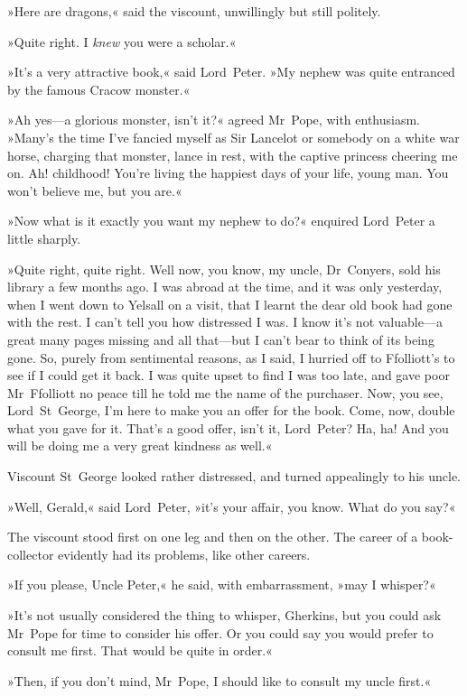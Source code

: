 »Here are dragons,« said the viscount, unwillingly but still politely.

»Quite right. I \textit{knew} you were a scholar.«

»It's a very attractive book,« said Lord~Peter. »My nephew was quite entranced by the famous Cracow monster.«

»Ah yes—a glorious monster, isn't it?« agreed Mr~Pope, with enthusiasm. »Many's the time I've fancied myself as Sir Lancelot or somebody on a white war horse, charging that monster, lance in rest, with the captive princess cheering me on. Ah! childhood! You're living the happiest days of your life, young man. You won't believe me, but you are.«

»Now what is it exactly you want my nephew to do?« enquired Lord~Peter a little sharply.

»Quite right, quite right. Well now, you know, my uncle, Dr~Conyers, sold his library a few months ago. I was abroad at the time, and it was only yesterday, when I went down to Yelsall on a visit, that I learnt the dear old book had gone with the rest. I can't tell you how distressed I was. I know it's not valuable—a great many pages missing and all that—but I can't bear to think of its being gone. So, purely from sentimental reasons, as I said, I hurried off to Ffolliott's to see if I could get it back. I was quite upset to find I was too late, and gave poor Mr~Ffolliott no peace till he told me the name of the purchaser. Now, you see, Lord~St~George, I'm here to make you an offer for the book. Come, now, double what you gave for it. That's a good offer, isn't it, Lord~Peter? Ha, ha! And you will be doing me a very great kindness as well.«

Viscount St~George looked rather distressed, and turned appealingly to his uncle.

»Well, Gerald,« said Lord~Peter, »it's your affair, you know. What do you say?«

The viscount stood first on one leg and then on the other. The career of a book-collector evidently had its problems, like other careers.

»If you please, Uncle Peter,« he said, with embarrassment, »may I whisper?«

»It's not usually considered the thing to whisper, Gherkins, but you could ask Mr~Pope for time to consider his offer. Or you could say you would prefer to consult me first. That would be quite in order.«

»Then, if you don't mind, Mr~Pope, I should like to consult my uncle first.«

